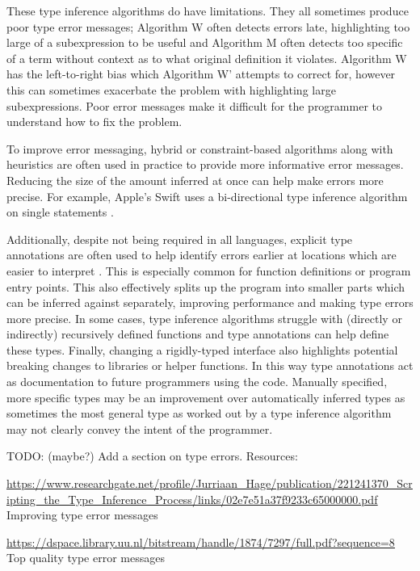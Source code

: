 \documentclass[a4paper,fleqn,twoside,12pt]{report}
\begin{document}
These type inference algorithms do have limitations. They all sometimes produce poor type error messages; Algorithm W often detects errors late, highlighting too large of a subexpression to be useful and Algorithm M often detects too specific of a term without context as to what original definition it violates. Algorithm W has the left-to-right bias which Algorithm W’ attempts to correct for, however this can sometimes exacerbate the problem with highlighting large subexpressions. Poor error messages make it difficult for the programmer to understand how to fix the problem.

To improve error messaging, hybrid or constraint-based algorithms along with heuristics are often used in practice to provide more informative error messages. Reducing the size of the amount inferred at once can help make errors more precise. For example, Apple’s Swift uses a bi-directional type inference algorithm on single statements \citep{ref34}.

Additionally, despite not being required in all languages, explicit type annotations are often used to help identify errors earlier at locations which are easier to interpret \citep{ref35}. This is especially common for function definitions or program entry points. This also effectively splits up the program into smaller parts which can be inferred against separately, improving performance and making type errors more precise. In some cases, type inference algorithms struggle with (directly or indirectly) recursively defined functions and type annotations can help define these types. Finally, changing a rigidly-typed interface also highlights potential breaking changes to libraries or helper functions. In this way type annotations act as documentation to future programmers using the code. Manually specified, more specific types may be an improvement over automatically inferred types as sometimes the most general type as worked out by a type inference algorithm may not clearly convey the intent of the programmer.

TODO: (maybe?) Add a section on type errors. Resources:

\underline{\href{https://www.researchgate.net/profile/Jurriaan\_Hage/publication/221241370\_Scripting\_the\_Type\_Inference\_Process/links/02e7e51a37f9233c65000000.pdf}{https://www.researchgate.net/profile/Jurriaan\_Hage/publication/221241370\_Scripting\_the\_Type\_Inference\_Process/links/02e7e51a37f9233c65000000.pdf}}
Improving type error messages

\underline{\href{https://dspace.library.uu.nl/bitstream/handle/1874/7297/full.pdf?sequence=8}{https://dspace.library.uu.nl/bitstream/handle/1874/7297/full.pdf?sequence=8}}
Top quality type error messages
\end{document}
